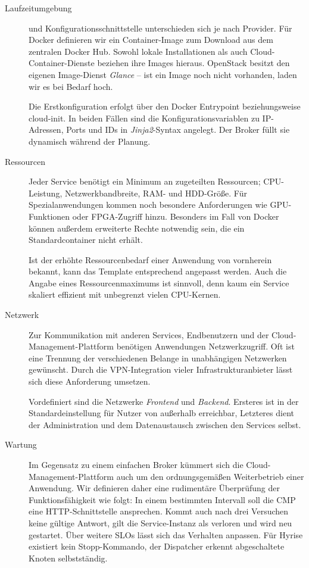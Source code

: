 \begin{description}
	\item[Laufzeitumgebung] und Konfigurationsschnittstelle unterschieden sich je nach Provider. Für Docker definieren wir ein Container-Image zum Download aus dem zentralen Docker Hub. Sowohl lokale Installationen als auch Cloud-Container-Dienste beziehen ihre Images hieraus. OpenStack besitzt den eigenen Image-Dienst \emph{Glance} -- ist ein Image noch nicht vorhanden, laden wir es bei Bedarf hoch.
	
	Die Erstkonfiguration erfolgt über den Docker Entrypoint beziehungsweise cloud-init. In beiden Fällen sind die Konfigurationsvariablen zu IP-Adressen, Ports und IDs in \emph{Jinja2}-Syntax angelegt. Der Broker füllt sie dynamisch während der Planung.
	
	\item[Ressourcen] Jeder Service benötigt ein Minimum an zugeteilten Ressourcen; CPU-Leistung, Netzwerkbandbreite, RAM- und HDD-Größe. Für Spezialanwendungen kommen noch besondere Anforderungen wie GPU-Funktionen oder FPGA-Zugriff hinzu. Besonders im Fall von Docker können außerdem erweiterte Rechte notwendig sein, die ein Standardcontainer nicht erhält. 
	
	Ist der erhöhte Ressourcenbedarf einer Anwendung von vornherein bekannt, kann das Template entsprechend angepasst werden. Auch die Angabe eines Ressourcenmaximums ist sinnvoll, denn kaum ein Service skaliert effizient mit unbegrenzt vielen CPU-Kernen.
	
	\item[Netzwerk] Zur Kommunikation mit anderen Services, Endbenutzern und der Cloud-Management-Plattform benötigen Anwendungen Netzwerkzugriff. Oft ist eine Trennung der verschiedenen Belange in unabhängigen Netzwerken gewünscht. Durch die VPN-Integration vieler Infrastrukturanbieter lässt sich diese Anforderung umsetzen. 
	
	Vordefiniert sind die Netzwerke \emph{Frontend} und \emph{Backend}. Ersteres ist in der Standardeinstellung für Nutzer von außerhalb erreichbar, Letzteres dient der Administration und dem Datenaustausch zwischen den Services selbst.
		
	\item[Wartung] Im Gegensatz zu einem einfachen Broker kümmert sich die Cloud-Management-Plattform auch um den ordnungsgemäßen Weiterbetrieb einer Anwendung. Wir definieren daher eine rudimentäre Überprüfung der Funktionsfähigkeit wie folgt: In einem bestimmten Intervall soll die CMP eine HTTP-Schnittstelle ansprechen. Kommt auch nach drei Versuchen keine gültige Antwort, gilt die Service-Instanz als verloren und wird neu gestartet. Über weitere SLOs lässt sich das Verhalten anpassen. Für Hyrise existiert kein Stopp-Kommando, der Dispatcher erkennt abgeschaltete Knoten selbstständig.
	
\end{description}

